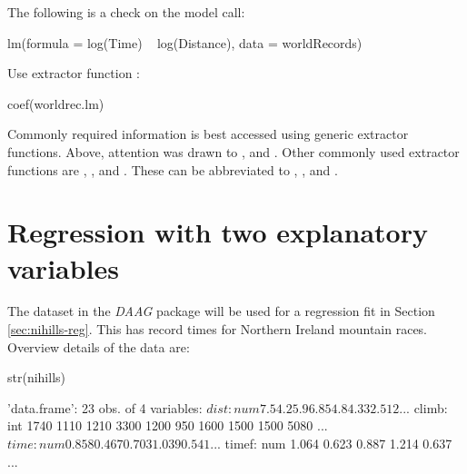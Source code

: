 The following is a check on the model call:
\begin{fullwidth}

\begin{Schunk}
\begin{Soutput}
lm(formula = log(Time) ~ log(Distance), data = worldRecords)
\end{Soutput}
\end{Schunk}

\end{fullwidth}

\begin{marginfigure}[40pt]
Use extractor function :\\[-3pt]
\begin{Schunk}
\begin{Sinput}
coef(worldrec.lm)
\end{Sinput}
\end{Schunk}
\end{marginfigure}
Commonly required information is best accessed using generic
extractor functions.  Above, attention was drawn to ,
 and .  Other commonly used extractor
functions are , , and
. These can be abbreviated to ,
, and .

\section{Regression with two explanatory variables}\label{sec:nihills}

The dataset  in the {\em DAAG} package will be used for
a regression fit in Section \ref{sec:nihills-reg}.  This has record
times for Northern Ireland mountain races. Overview details of the
data are:
\begin{fullwidth}
\begin{Schunk}
\begin{Sinput}
str(nihills)
\end{Sinput}
\begin{Soutput}
'data.frame':	23 obs. of  4 variables:
 $ dist : num  7.5 4.2 5.9 6.8 5 4.8 4.3 3 2.5 12 ...
 $ climb: int  1740 1110 1210 3300 1200 950 1600 1500 1500 5080 ...
 $ time : num  0.858 0.467 0.703 1.039 0.541 ...
 $ timef: num  1.064 0.623 0.887 1.214 0.637 ...
\end{Soutput}
\end{Schunk}
\end{fullwidth}



